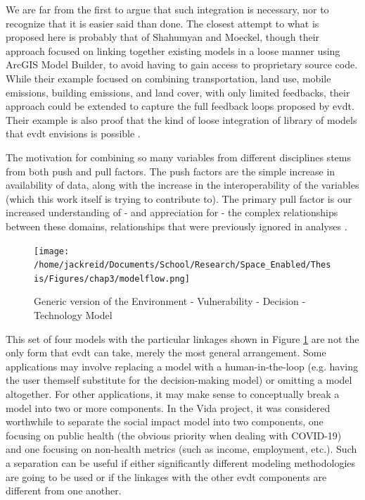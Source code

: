 We are far from the first to argue that such integration is necessary, nor to recognize that it is easier said than done. The closest attempt to what is proposed here is probably that of Shahumyan and Moeckel, though their approach focused on linking together existing models in a loose manner using ArcGIS Model Builder, to avoid having to gain access to proprietary source code. While their example focused on combining transportation, land use, mobile emissions, building emissions, and land cover, with only limited feedbacks, their approach could be extended to capture the full feedback loops proposed by \ac{evdt}. Their example is also proof that the kind of loose integration of library of models that \ac{evdt} envisions is possible \cite{shahumyanIntegrationLandUse2017}. 

The motivation for combining so many variables from different disciplines stems from both push and pull factors. The push factors are the simple increase in availability of data, along with the increase in the interoperability of the variables (which this work itself is trying to contribute to). The primary pull factor is our increased understanding of - and appreciation for - the complex relationships between these domains, relationships that were previously ignored in analyses \cite{gaheganMultivariateGeovisualization2007}. 

\begin{figure}[h]
    \centering
    \texttt{[image: /home/jackreid/Documents/School/Research/Space\_Enabled/Thesis/Figures/chap3/modelflow.png]}
    \caption[Generic version of EVDT Model] {Generic version of the Environment - Vulnerability - Decision - Technology Model}
    \label{fig:model}
\end{figure}

This set of four models with the particular linkages shown in Figure \ref{fig:model} are not the only form that \ac{evdt} can take, merely the most general arrangement. Some applications may involve replacing a model with a human-in-the-loop (e.g. having the user themself substitute for the decision-making model) or omitting a model altogether. For other applications, it may make sense to conceptually break a model into two or more components. In the Vida project, it was considered worthwhile to separate the social impact model into two components, one focusing on public health (the obvious priority when dealing with COVID-19) and one focusing on non-health metrics (such as income, employment, etc.). Such a separation can be useful if either significantly different modeling methodologies are going to be used or if the linkages with the other \ac{evdt} components are different from one another. 

